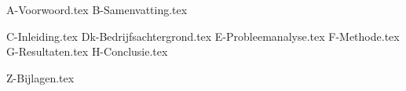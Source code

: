 \documentclass[10pt,a4paper,twoside]{report}
\begin{document}

{A-Voorwoord.tex}
{B-Samenvatting.tex}

\setcounter{page}{5} %
\tableofcontents
\thispagestyle{empty} %

{C-Inleiding.tex}
{Dk-Bedrijfsachtergrond.tex}
{E-Probleemanalyse.tex}
{F-Methode.tex}
{G-Resultaten.tex}
{H-Conclusie.tex}

\printbibliography
{} %

{Z-Bijlagen.tex}
\end{document}

